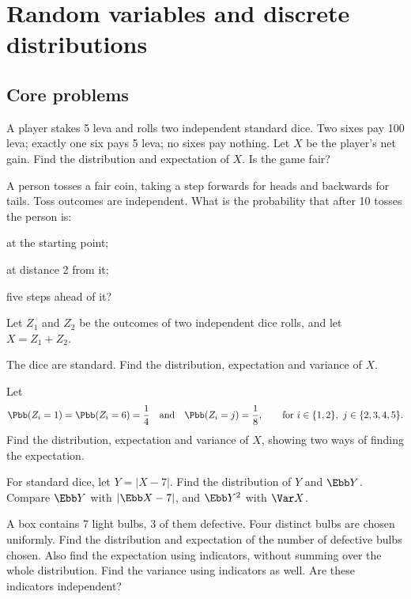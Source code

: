 \section{Random variables and discrete distributions}
\subsection*{Core problems}
\begin{problembook}
A player stakes 5 leva and rolls two independent standard dice. Two sixes pay
100 leva; exactly one six pays 5 leva; no sixes pay nothing. Let $X$ be the player's
net gain. Find the distribution and expectation of $X$. Is the game fair?
\end{problembook}
\begin{problembook}
A person tosses a fair coin, taking a step forwards for heads and backwards for
tails. Toss outcomes are independent. What is the probability that after 10 tosses the person is:
\begin{enumeratea}
  \item at the starting point;
  \item at distance 2 from it;
  \item five steps ahead of it?
\end{enumeratea}
\end{problembook}
\begin{problembook}
Let $Z_1$ and $Z_2$ be the outcomes of two independent dice rolls, and let $X=Z_1+Z_2$.
\begin{enumeratea}
  \item The dice are standard. Find the distribution, expectation and variance of $X$.
  \item Let
  \[
  \Pbb(Z_i=1)=\Pbb(Z_i=6)=\frac14
  \quad\text{and}\quad\Pbb(Z_i=j)=\frac18,
  \qquad\text{for }i\in\{1,2\},\ j\in\{2,3,4,5\}.
  \]
  Find the distribution, expectation and variance of $X$, showing two ways of finding the expectation.
  \item For standard dice, let $Y=|X-7|$. Find the distribution of $Y$ and $\Ebb Y$.
  Compare $\Ebb Y$ with $|\Ebb X-7|$, and $\Ebb Y^2$ with $\Var X$.
\end{enumeratea}
\end{problembook}
\begin{problem}
A box contains 7 light bulbs, 3 of them defective. Four distinct bulbs are chosen
uniformly. Find the distribution and expectation of the number of defective bulbs
chosen. Also find the expectation using indicators, without summing over the whole
distribution. Find the variance using indicators as well. Are these indicators independent?
\end{problem}
